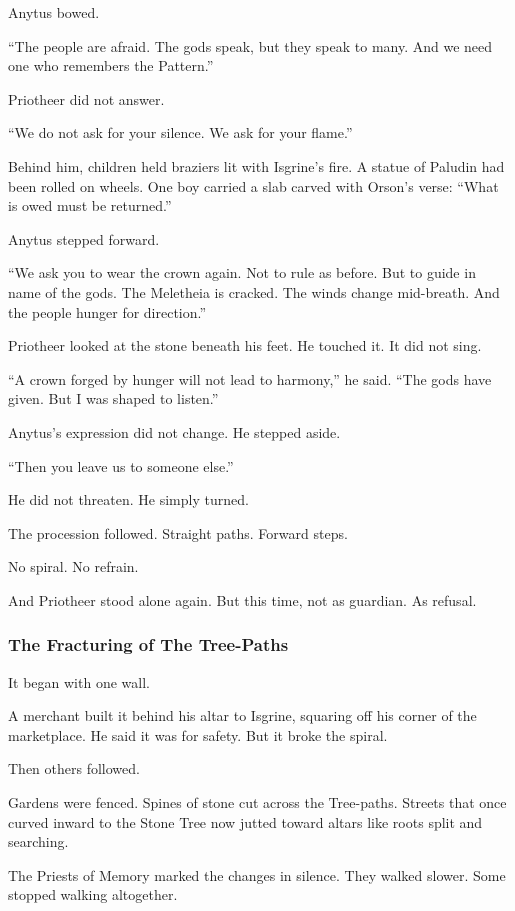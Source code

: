 \documentclass[12pt]{article}
\begin{document}
Anytus bowed.

 “The people are afraid.  
 The gods speak, but they speak to many.  
 And we need one who remembers the Pattern.”

Priotheer did not answer.

 “We do not ask for your silence.  
 We ask for your flame.”

Behind him, children held braziers lit with Isgrine’s fire.  
A statue of Paludin had been rolled on wheels.  
One boy carried a slab carved with Orson’s verse:  
 “What is owed must be returned.”

Anytus stepped forward.

 “We ask you to wear the crown again.  
 Not to rule as before.  
 But to guide in name of the gods.  
 The Meletheia is cracked.  
 The winds change mid-breath.  
 And the people hunger for direction.”

Priotheer looked at the stone beneath his feet.  
He touched it.  
It did not sing.

 “A crown forged by hunger will not lead to harmony,” he said.  
 “The gods have given.  
 But I was shaped to listen.”

Anytus’s expression did not change.  
He stepped aside.

 “Then you leave us to someone else.”

He did not threaten.  
He simply turned.

The procession followed.  
Straight paths. Forward steps.

No spiral.  
No refrain.

And Priotheer stood alone again.  
But this time, not as guardian.  
As refusal.


\dotfill

\subsubsection*{The Fracturing of The Tree-Paths}

It began with one wall.

A merchant built it behind his altar to Isgrine,  
squaring off his corner of the marketplace.  
He said it was for safety.  
But it broke the spiral.

Then others followed.

Gardens were fenced.  
Spines of stone cut across the Tree-paths.  
Streets that once curved inward to the Stone Tree  
now jutted toward altars like roots split and searching.

The Priests of Memory marked the changes in silence.  
They walked slower.  
Some stopped walking altogether.
\end{document}
